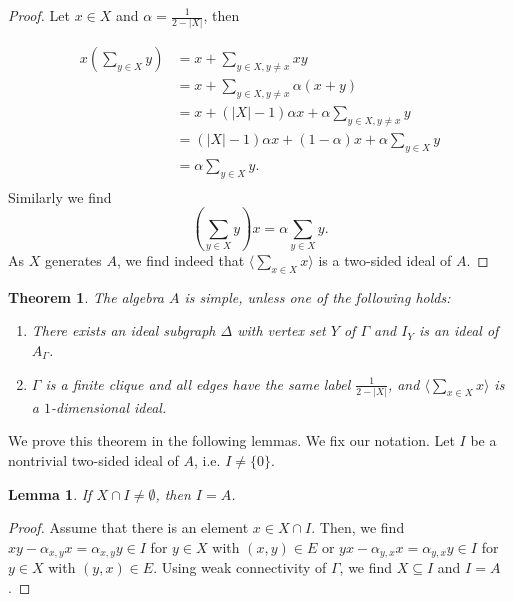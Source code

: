 \documentclass[oneside,a4paper]{amsart} %
\newtheorem{lemma}[proposition]{Lemma}
\newtheorem{theorem}[proposition]{Theorem}
\theoremstyle{definition}
\begin{document}
\begin{proof}
Let $x\in X$ and $\alpha=\frac{1}{2-|X|}$, then 

$$\begin{array}{ll}
x (\displaystyle\sum_{y\in X} y)
&=x+\displaystyle\sum_{y\in X,y\neq x} xy\\
&=x+\displaystyle\sum_{y\in X,y\neq x}\alpha(x+y)\\
&=x+(|X|-1)\alpha x+\alpha\displaystyle\sum_{y\in X,y\neq x} y\\
&=(|X|-1)\alpha x+(1-\alpha)x +\alpha \displaystyle\sum_{y\in X} y\\
&=\alpha \displaystyle\sum_{y\in X} y.\\
\end{array}$$
Similarly we find 
$$(\displaystyle\sum_{y\in X} y)x=\alpha \displaystyle\sum_{y\in X} y.$$
As $X$ generates $A$, we find indeed that $\langle\displaystyle\sum_{x\in X} x\rangle$ is a two-sided ideal of $A$.
\end{proof}


\begin{theorem}\label{simple}
The algebra $A$ is simple, unless  one of the following holds: 
\begin{enumerate}
\item 
There exists an ideal subgraph $\Delta$ with vertex set $Y$ of $\Gamma$ and $I_Y$ is an ideal of $A_\Gamma$.
\item $\Gamma$ is a finite clique and all edges have the same label $\frac{1}{2-|X|}$,
and $\langle \displaystyle\sum_{x\in X} x\rangle$ is a $1$-dimensional ideal.
\end{enumerate}
\end{theorem}

We prove this theorem in the following lemmas.
We fix our notation.
Let $I$ be a nontrivial two-sided ideal of $A$, i.e. $I\neq \{0\}$.


\begin{lemma}
If $X\cap I\neq \emptyset$, then $I=A$.
\end{lemma}

\begin{proof}
Assume that there is an element $x\in X\cap I$.
Then,  we find  $xy-\alpha_{x,y} x=\alpha_{x,y} y\in I$ for $y\in X$ with $(x,y)\in E$ or 
$yx-\alpha_{y,x} x=\alpha_{y,x} y\in I$ for $y\in X$ with $(y,x)\in E$. 
Using weak connectivity of $\Gamma$, we find $X\subseteq I$ and $I=A$.
\end{proof}
\end{document}
